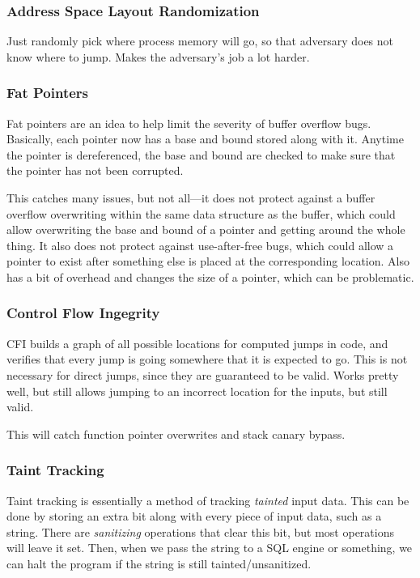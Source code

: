 \documentclass{article}
\begin{document}
\begin{multicols*}{2}
\subsubsection{Address Space Layout Randomization}
Just randomly pick where process memory will go, so that adversary does not know where to jump. Makes the adversary's job a lot harder. 

\subsubsection{Fat Pointers}
Fat pointers are an idea to help limit the severity of buffer overflow bugs. Basically, each pointer now has a base and bound stored along with it. Anytime the pointer is dereferenced, the base and bound are checked to make sure that the pointer has not been corrupted.

This catches many issues, but not all---it does not protect against a buffer overflow overwriting within the same data structure as the buffer, which could allow overwriting the base and bound of a pointer and getting around the whole thing. It also does not protect against use-after-free bugs, which could allow a pointer to exist after something else is placed at the corresponding location. Also has a bit of overhead and changes the size of a pointer, which can be problematic. 

\subsubsection{Control Flow Ingegrity}
CFI builds a graph of all possible locations for computed jumps in code, and verifies that every jump is going somewhere that it is expected to go. This is not necessary for direct jumps, since they are guaranteed to be valid. Works pretty well, but still allows jumping to an incorrect location for the inputs, but still valid.

This will catch function pointer overwrites and stack canary bypass.

\subsubsection{Taint Tracking}
Taint tracking is essentially a method of tracking \textit{tainted} input data. This can be done by storing an extra bit along with every piece of input data, such as a string. There are \textit{sanitizing} operations that clear this bit, but most operations will leave it set. Then, when we pass the string to a SQL engine or something, we can halt the program if the string is still tainted/unsanitized. 


\end{multicols*}
\end{document}
